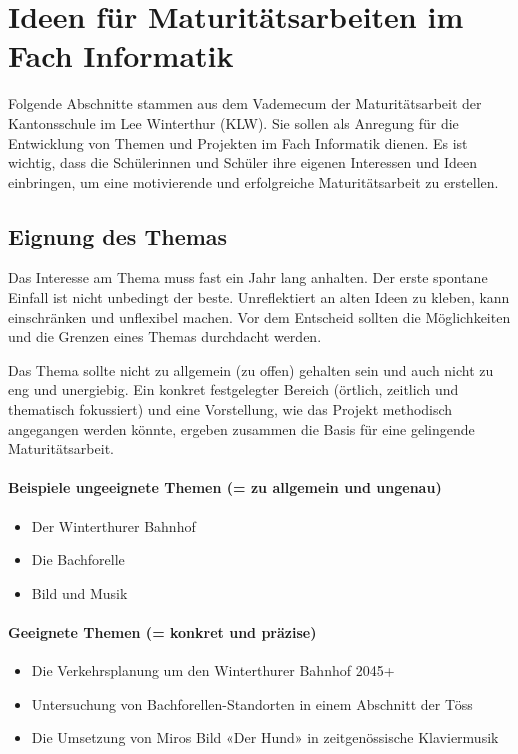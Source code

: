 
\section*{Ideen für Maturitätsarbeiten im Fach Informatik}
Folgende Abschnitte stammen aus dem Vademecum der Maturitätsarbeit der Kantonsschule im Lee Winterthur (KLW). Sie sollen als Anregung für die Entwicklung von Themen und Projekten im Fach Informatik dienen. Es ist wichtig, dass die Schülerinnen und Schüler ihre eigenen Interessen und Ideen einbringen, um eine motivierende und erfolgreiche Maturitätsarbeit zu erstellen.
\begin{myExBox}
\subsection*{Eignung des Themas}

Das Interesse am Thema muss fast ein Jahr lang anhalten. Der erste spontane Einfall ist nicht
unbedingt der beste. Unreflektiert an alten Ideen zu kleben, kann einschränken und unflexibel
machen. Vor dem Entscheid sollten die Möglichkeiten und die Grenzen eines Themas durchdacht
werden.

Das Thema sollte nicht zu allgemein (zu offen) gehalten sein und auch nicht zu eng und
unergiebig. Ein konkret festgelegter Bereich (örtlich, zeitlich und thematisch fokussiert) und eine
Vorstellung, wie das Projekt methodisch angegangen werden könnte, ergeben zusammen die
Basis für eine gelingende Maturitätsarbeit.

\paragraph{Beispiele ungeeignete Themen (= zu allgemein und ungenau)}
\begin{itemize}
    \item Der Winterthurer Bahnhof
    \item Die Bachforelle
    \item Bild und Musik
\end{itemize}

\paragraph{Geeignete Themen (= konkret und präzise)}
\begin{itemize}
    \item Die Verkehrsplanung um den Winterthurer Bahnhof 2045+
    \item Untersuchung von Bachforellen-Standorten in einem Abschnitt der Töss
    \item Die Umsetzung von Miros Bild «Der Hund» in zeitgenössische Klaviermusik
\end{itemize}


\end{myExBox}
